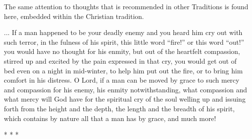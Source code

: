 The same attention to thoughts that is recommended in other Traditions is found here, embedded within the Christian tradition.

\begin{quotex}
... If a man happened to be your deadly enemy and you heard him cry out with such terror, in the fulness of his spirit, this little word ``fire!'' or this word ``out!'' you would have no thought for his enmity, but out of the heartfelt compassion, stirred up and excited by the pain expressed in that cry, you would get out of bed even on a night in mid-winter, to help him put out the fire, or to bring him comfort in his distress. O Lord, if a man can be moved by grace to such mercy and compassion for his enemy, his enmity notwithstanding, what compassion and what mercy will God have for the spiritual cry of the soul welling up and issuing forth from the height and the depth, the length and the breadth of his spirit, which contains by nature all that a man has by grace, and much more!
\end{quotex}




\begin{center}* * *\end{center}

